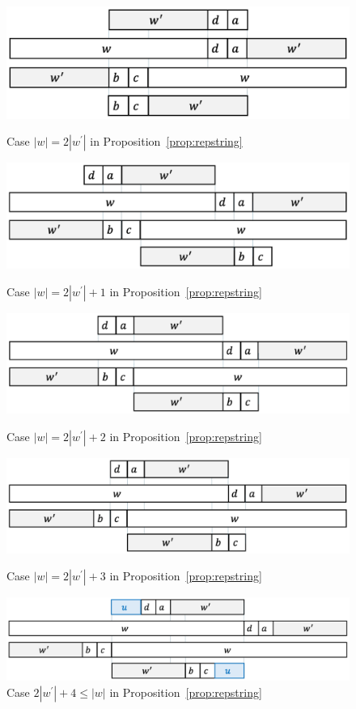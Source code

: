 \begin{figure}[t]
\begin{center}
  \includegraphics[scale=0.345]{figs/w=2w_1.pdf}
  \caption{Case $|w| = 2|w^{\prime}|$ in Proposition~\ref{prop:repstring}}\label{fig:prop_pic14}
  \bigskip
  \includegraphics[scale=0.345]{figs/w=2w_1+1.pdf}
  \caption{Case $|w| = 2|w^{\prime}| + 1$ in Proposition~\ref{prop:repstring}}\label{fig:prop_pic13}
  \bigskip
  \includegraphics[scale=0.345]{figs/w=2w_1+2.pdf}
  \caption{Case $|w| = 2|w^{\prime}| + 2$ in Proposition~\ref{prop:repstring}}\label{fig:prop_pic12}
  \bigskip
  \includegraphics[scale=0.345]{figs/w=2w_1+3.pdf}
  \caption{Case $|w| = 2|w^{\prime}| + 3$ in Proposition~\ref{prop:repstring}}\label{fig:prop_pic11}
\end{center}
\end{figure}

\begin{figure}[t]
\begin{center}
  \includegraphics[scale=0.345]{figs/w=2w_1+4.pdf}
  \caption{Case $2|w^{\prime}| + 4 \leq |w|$ in Proposition~\ref{prop:repstring}}\label{fig:prop_pic10}
\end{center}
\end{figure}
